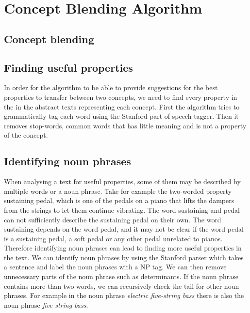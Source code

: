 
\chapter{Concept Blending Algorithm} %

\label{Chapter5} %


\section{Concept blending}


\section{Finding useful properties}
In order for the algorithm to be able to provide suggestions for the best properties to transfer between two concepts, we need to find every property in the in the abstract texts representing each concept. First the algorithm tries to grammatically tag each word using the Stanford part-of-speech tagger. Then it removes stop-words, common words that has little meaning and is not a property of the concept.


\section{Identifying noun phrases}
When analysing a text for useful properties, some of them may be described by multiple words or a noun phrase. Take for example the two-worded property sustaining pedal, which is one of the pedals on a piano that lifts the dampers from the strings to let them continue vibrating. The word sustaining and pedal can not sufficiently describe the sustaining pedal on their own. The word sustaining depends on the word pedal, and it may not be clear if the word pedal is a sustaining pedal, a soft pedal or any other pedal unrelated to pianos. Therefore identifying noun phrases can lead to finding more useful properties in the text. We can identify noun phrases by using the Stanford parser which takes a sentence and label the noun phrases with a NP tag. We can then remove unnecessary parts of the noun phrase such as determinants. If the noun phrase contains more than two words, we can recursively check the tail for other noun phrases. For example in the noun phrase \emph{electric five-string bass} there is also the noun phrase \emph{five-string bass}.

